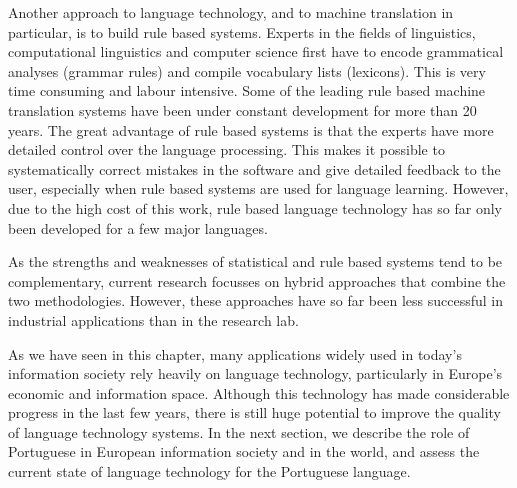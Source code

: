 \begin{multicols}{2}
Another approach to language technology, and to machine translation in particular, is to build rule based systems. Experts in the fields of linguistics, computational linguistics and computer science first have to encode grammatical analyses (grammar rules) and compile vocabulary lists (lexicons). This is very time consuming and labour intensive. Some of the leading rule based machine translation systems have been under constant development for more than 20 years. The great advantage of rule based systems is that the experts have more detailed control over the language processing. This makes it possible to systematically correct mistakes in the software and give detailed feedback to the user, especially when rule based systems are used for language learning. However, due to the high cost of this work, rule based language technology has so far only been developed for a few major languages. 

As the strengths and weaknesses of statistical and rule based systems tend to be complementary, current research focusses on hybrid approaches that combine the two methodologies. However, these approaches have so far been less successful in industrial applications than in the research lab. 


As we have seen in this chapter, many applications widely used in today’s information society rely heavily on language technology, particularly in Europe’s economic and information space. Although this technology has made considerable progress in the last few years, there is still huge potential to improve the quality of language technology systems. In the next section, we describe the role of Portuguese in European information society and in the world, and assess the current state of language technology for the Portuguese language.
\end{multicols}

\clearpage


